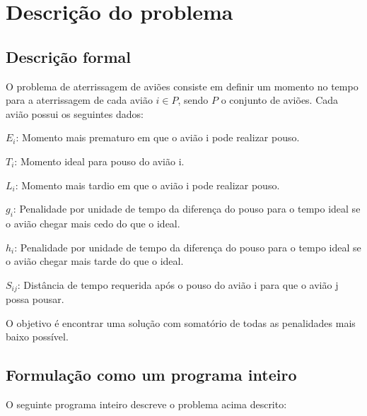 \documentclass[a4paper,10pt]{abnt} %
\begin{document}
\folhaderosto
\sumario


\chapter{Descrição do problema}

\section{Descrição formal}

O problema de aterrissagem de aviões consiste em definir um momento no tempo para a aterrissagem de cada avião $ i \in P $, sendo $P$ o conjunto de aviões. Cada avião possui os seguintes dados:

$ E_i$: Momento mais prematuro em que o avião i pode realizar pouso.

$T_i$: Momento ideal para pouso do avião i.

$L_i$: Momento mais tardio em que o avião i pode realizar pouso.

$g_i$: Penalidade por unidade de tempo da diferença do pouso para o tempo ideal se o avião chegar mais cedo do que o ideal.

$h_i$: Penalidade por unidade de tempo da diferença do pouso para o tempo ideal se o avião chegar mais tarde do que o ideal.

$S_{ij}$: Distância de tempo requerida após o pouso do avião i para que o avião j possa pousar.

O objetivo é encontrar uma solução com somatório de todas as penalidades mais baixo possível.

\section{Formulação como um programa inteiro}

O seguinte programa inteiro descreve o problema acima descrito:
\end{document}
